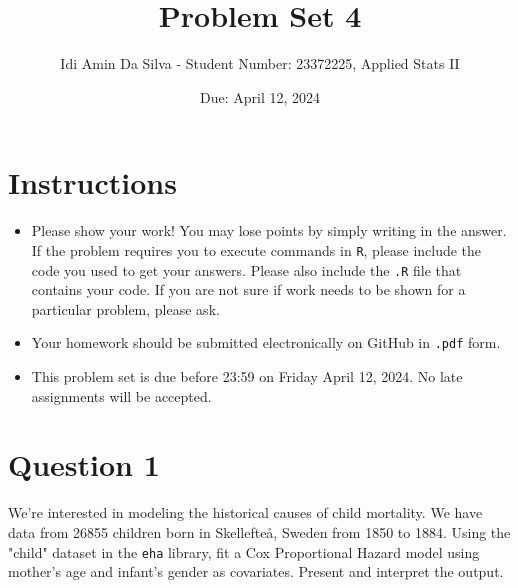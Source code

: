 \documentclass[12pt,letterpaper]{article}
\title{Problem Set 4}
\date{Due: April 12, 2024}
\author{Idi Amin Da Silva - Student Number: 23372225, Applied Stats II}
\begin{document}
	\maketitle
	\section*{Instructions}
	\begin{itemize}
	\item Please show your work! You may lose points by simply writing in the answer. If the problem requires you to execute commands in \texttt{R}, please include the code you used to get your answers. Please also include the \texttt{.R} file that contains your code. If you are not sure if work needs to be shown for a particular problem, please ask.
	\item Your homework should be submitted electronically on GitHub in \texttt{.pdf} form.
	\item This problem set is due before 23:59 on Friday April 12, 2024. No late assignments will be accepted.

	\end{itemize}

	\vspace{.25cm}
\section*{Question 1}
\vspace{.25cm}
\noindent We're interested in modeling the historical causes of child mortality. We have data from 26855 children born in Skellefteå, Sweden from 1850 to 1884. Using the "child" dataset in the \texttt{eha} library, fit a Cox Proportional Hazard model using mother's age and infant's gender as covariates. Present and interpret the output.

	
	
	
\end{document}
